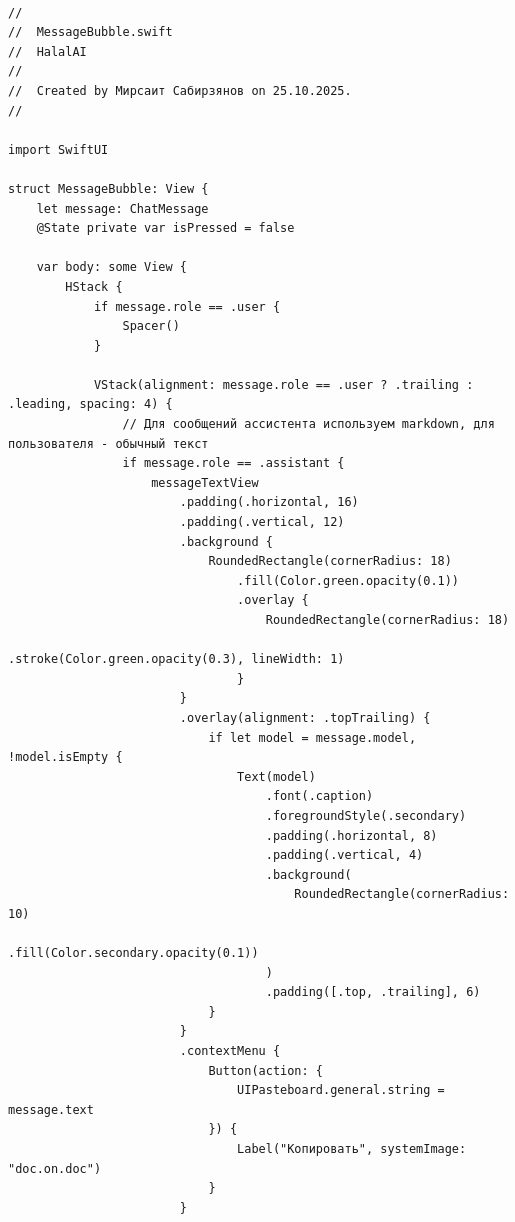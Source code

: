 \begin{lstlisting}[basicstyle=\tiny\ttfamily,breaklines=true]

//
//  MessageBubble.swift
//  HalalAI
//
//  Created by Мирсаит Сабирзянов on 25.10.2025.
//

import SwiftUI

struct MessageBubble: View {
    let message: ChatMessage
    @State private var isPressed = false
    
    var body: some View {
        HStack {
            if message.role == .user {
                Spacer()
            }
            
            VStack(alignment: message.role == .user ? .trailing : .leading, spacing: 4) {
                // Для сообщений ассистента используем markdown, для пользователя - обычный текст
                if message.role == .assistant {
                    messageTextView
                        .padding(.horizontal, 16)
                        .padding(.vertical, 12)
                        .background {
                            RoundedRectangle(cornerRadius: 18)
                                .fill(Color.green.opacity(0.1))
                                .overlay {
                                    RoundedRectangle(cornerRadius: 18)
                                        .stroke(Color.green.opacity(0.3), lineWidth: 1)
                                }
                        }
                        .overlay(alignment: .topTrailing) {
                            if let model = message.model, !model.isEmpty {
                                Text(model)
                                    .font(.caption)
                                    .foregroundStyle(.secondary)
                                    .padding(.horizontal, 8)
                                    .padding(.vertical, 4)
                                    .background(
                                        RoundedRectangle(cornerRadius: 10)
                                            .fill(Color.secondary.opacity(0.1))
                                    )
                                    .padding([.top, .trailing], 6)
                            }
                        }
                        .contextMenu {
                            Button(action: {
                                UIPasteboard.general.string = message.text
                            }) {
                                Label("Копировать", systemImage: "doc.on.doc")
                            }
                        }

\end{lstlisting}
